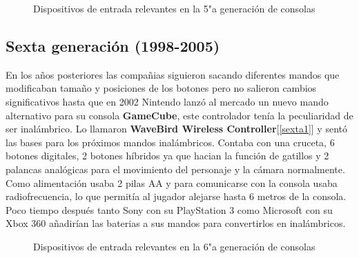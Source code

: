 \begin{figure}[!ht]
     \hfill
     \caption{Dispositivos de entrada relevantes en la 5"a  generaci\'on de consolas}
     \label{fig:quinta}
   \end{figure}


\subsection{Sexta generaci\'on (1998-2005)}

En los a\~nos posteriores las compa\~nias siguieron sacando diferentes mandos que modificaban tama\~no y posiciones de los botones pero no salieron cambios significativos hasta que en 2002 Nintendo lanz\'o al mercado un nuevo mando alternativo para su consola \textbf{GameCube}, este controlador ten\'ia la peculiaridad de ser inal\'ambrico. Lo llamaron \textbf{WaveBird Wireless Controller}[\ref{sexta1}] y sent\'o las bases para los pr\'oximos mandos inal\'ambricos. Contaba con una cruceta, 6 botones digitales, 2 botones h\'ibridos ya que hacian la funci\'on de gatillos y 2 palancas anal\'ogicas para el movimiento del personaje y la c\'amara normalmente. Como alimentaci\'on usaba 2 pilas AA y para comunicarse con la consola usaba radiofrecuencia, lo que permit\'ia al jugador alejarse hasta 6 metros de la consola. Poco tiempo despu\'es tanto Sony con su PlayStation 3 como Microsoft con su Xbox 360 a\~nadir\'ian las baterias a sus mandos para convertirlos en inal\'ambricos. \\


\begin{figure}[!ht]
     \hfill
     \caption{Dispositivos de entrada relevantes en la 6"a  generaci\'on de consolas}
     \label{fig:sexta}
   \end{figure}


